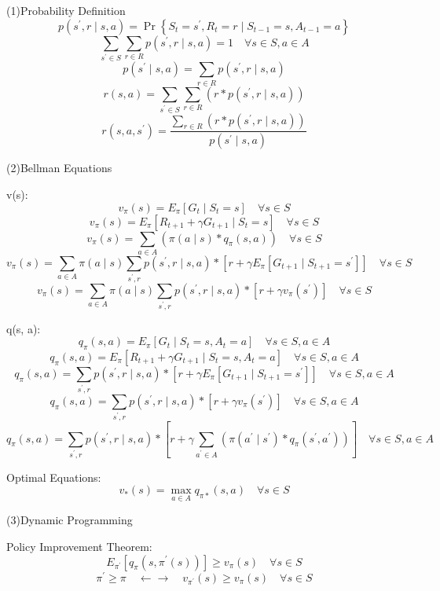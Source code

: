 \documentclass{article}
\theoremstyle{plain}
\theoremstyle{definition}
\theoremstyle{remark}
\begin{document}
(1)Probability Definition
$$p\left(s^{\prime}, r \mid s, a\right)=\operatorname{Pr}\left\{S_{t}=s^{\prime}, R_{t}=r \mid S_{t-1}=s, A_{t-1}=a\right\}$$
$$\sum_{s^{\prime} \in S} \sum_{r \in R} p\left(s^{\prime}, r \mid s, a\right)=1 \quad \forall s \in S, a \in A$$
$$p\left(s^{\prime} \mid s, a\right)=\sum_{r \in R} p\left(s^{\prime}, r \mid s, a\right)$$
$$r(s, a)=\sum_{s^{\prime} \in S} \sum_{r \in R} \left(r * p\left(s^{\prime}, r \mid s, a\right)\right)$$
$$r\left(s, a, s^{\prime}\right)=
\frac{\sum_{r \in R} \left(r * p\left(s^{\prime}, r \mid s, a\right)\right)}
{p\left(s^{\prime} \mid s, a\right)}$$


(2)Bellman Equations

v(s):
$$v_{\pi}(s)=E_{\pi} \left[G_{t} \mid S_{t}=s\right] \quad \forall s \in S$$
$$v_{\pi}(s)=E_{\pi} \left[R_{t+1}+\gamma G_{t+1} \mid S_{t}=s\right] \quad \forall s \in S$$
$$v_{\pi}(s)=\sum_{a \in A} \left(\pi(a \mid s) * q_{\pi}(s, a)\right) \quad \forall s \in S$$
$$v_{\pi}(s)=\sum_{a \in A} \pi(a \mid s) \sum_{s^{\prime}, r} p\left(s^{\prime}, r \mid s, a\right) * 
\left[r+\gamma E_{\pi} \left[G_{t+1} \mid S_{t+1}=s^{\prime}\right]\right] \quad \forall s \in S$$
$$v_{\pi}(s)=\sum_{a \in A} \pi(a \mid s) \sum_{s^{\prime}, r} p\left(s^{\prime}, r \mid s, a\right) * 
\left[r+\gamma v_{\pi}\left(s^{\prime}\right)\right] \quad \forall s \in S$$

q(s, a):
$$q_{\pi}(s, a)=E_{\pi} \left[G_{t} \mid S_{t}=s, A_{t}=a\right] \quad \forall s \in S, a \in A$$
$$q_{\pi}(s, a)=E_{\pi} \left[R_{t+1}+\gamma G_{t+1} \mid S_{t}=s, A_{t}=a\right] \quad \forall s \in S, a \in A$$
$$q_{\pi}(s, a)=\sum_{s^{\prime}, r} p\left(s^{\prime}, r \mid s, a\right) * 
\left[r+\gamma E_{\pi} \left[G_{t+1} \mid S_{t+1}=s^{\prime}\right]\right] \quad \forall s \in S, a \in A$$
$$q_{\pi}(s, a)=\sum_{s^{\prime}, r} p\left(s^{\prime}, r \mid s, a\right) * 
\left[r+\gamma v_{\pi}\left(s^{\prime}\right)\right] \quad \forall s \in S, a \in A$$
$$q_{\pi}(s, a)=\sum_{s^{\prime}, r} p\left(s^{\prime}, r \mid s, a\right) * 
\left[r+\gamma \sum_{a^{\prime} \in A} \left(\pi\left(a^{\prime} \mid s^{\prime}\right) * 
q_{\pi}\left(s^{\prime}, a^{\prime}\right)\right)\right] \quad \forall s \in S, a \in A$$

Optimal Equations:
$$v_{*}(s)=\max_{a \in A} q_{\pi *}(s, a) \quad \forall s \in S$$


(3)Dynamic Programming

Policy Improvement Theorem:
$$E_{\pi^{\prime}} \left[q_{\pi}\left(s, \pi^{\prime}(s)\right)\right] \geq v_{\pi}(s) \quad \forall s \in S$$
$$\pi^{\prime} \geq \pi \quad \leftarrow \rightarrow \quad v_{\pi^{\prime}}(s) \geq v_{\pi}(s) \quad \forall s \in S$$
\end{document}
